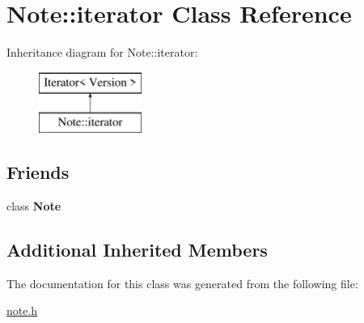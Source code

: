 \hypertarget{class_note_1_1iterator}{}\section{Note\+:\+:iterator Class Reference}
\label{class_note_1_1iterator}
Inheritance diagram for Note\+:\+:iterator\+:\begin{figure}[H]
\begin{center}
\leavevmode
\includegraphics[height=2.000000cm]{class_note_1_1iterator}
\end{center}
\end{figure}
\subsection*{Friends}
\begin{DoxyCompactItemize}
\item 
\mbox{\label{class_note_1_1iterator_a93d7e72623acdfa5b079a11fbf2d9f9d}} 
class {\bfseries Note}
\end{DoxyCompactItemize}
\subsection*{Additional Inherited Members}


The documentation for this class was generated from the following file\+:\begin{DoxyCompactItemize}
\item 
\hyperlink{note_8h}{note.\+h}\end{DoxyCompactItemize}
